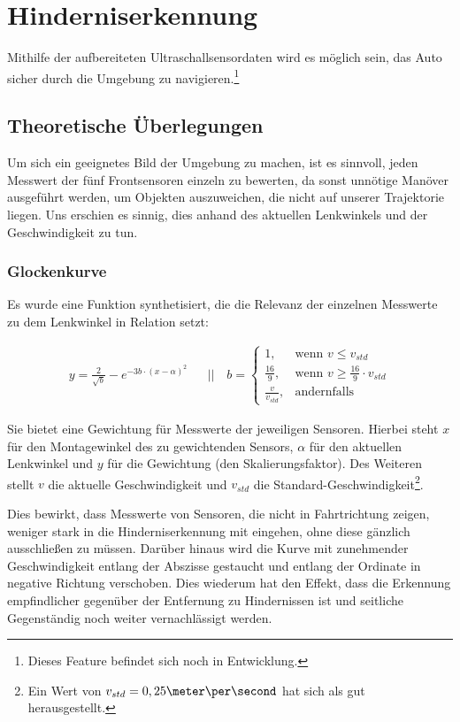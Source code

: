 \documentclass[a4paper,12pt]{report}
\begin{document}
\section{Hinderniserkennung}
\label{section-ObstacleDetection}

	Mithilfe der aufbereiteten Ultraschallsensordaten wird es möglich sein, das Auto sicher durch die Umgebung zu navigieren.\footnote{Dieses Feature befindet sich noch in Entwicklung.}

\subsection{Theoretische Überlegungen}

	Um sich ein geeignetes Bild der Umgebung zu machen, ist es sinnvoll, jeden  Messwert der fünf Frontsensoren einzeln zu bewerten, da sonst unnötige Manöver ausgeführt werden, um Objekten auszuweichen, die nicht auf unserer Trajektorie liegen.
	Uns erschien es sinnig, dies anhand des aktuellen Lenkwinkels und der Geschwindigkeit zu tun.

\subsubsection{Glockenkurve}

	Es wurde eine Funktion synthetisiert, die die Relevanz der einzelnen Messwerte zu dem Lenkwinkel in Relation setzt:

	\begin{align*}
		y=\frac{2}{\sqrt{b}} - e^{-3b \cdot \left( x-\alpha \right)^2}
		&&||\quad b=
		\begin{cases}
			1,					& \text{wenn } v \leq v_{std} \\
			\frac{16}{9},		& \text{wenn } v \geq \frac{16}{9} \cdot v_{std} \\
			\frac{v}{v_{std}}, 	& \text{andernfalls}
		\end{cases}
	\end{align*}


	Sie bietet eine Gewichtung für Messwerte der jeweiligen Sensoren.
	Hierbei steht $x$ für den Montagewinkel des zu gewichtenden Sensors, $\alpha$ für den aktuellen Lenkwinkel und $y$ für die Gewichtung (den Skalierungsfaktor).
	Des Weiteren stellt $v$ die aktuelle Geschwindigkeit und $v_{std}$ die Standard-Geschwindigkeit\footnote{Ein Wert von $v_{std} = 0,25\meter\per\second$ hat sich als gut herausgestellt.}.

	Dies bewirkt, dass Messwerte von Sensoren, die nicht in Fahrtrichtung zeigen, weniger stark in die Hinderniserkennung mit eingehen, ohne diese gänzlich ausschließen zu müssen.
	Darüber hinaus wird die Kurve mit zunehmender Geschwindigkeit entlang der Abszisse gestaucht und entlang der Ordinate in negative Richtung verschoben.
	Dies wiederum hat den Effekt, dass die Erkennung empfindlicher gegenüber der Entfernung zu Hindernissen ist und seitliche Gegenständig noch weiter vernachlässigt werden.
\end{document}
